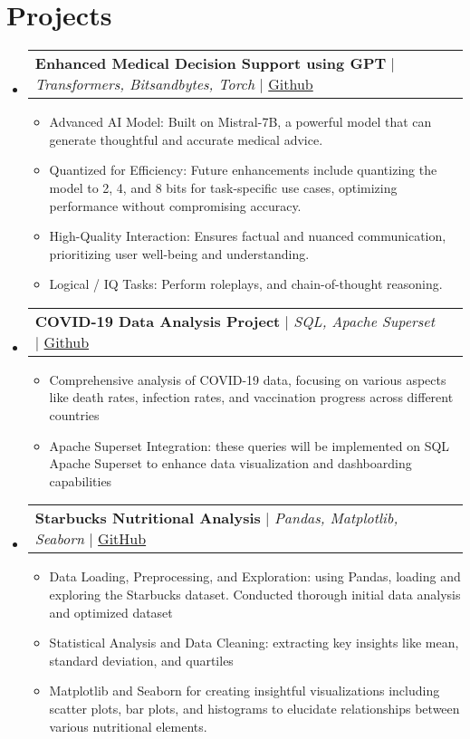 \documentclass[letterpaper,11pt]{article}
\makeatletter
\newcommand{\resumeItem}[1]{
  \item\small{
    {#1 \vspace{-2pt}}
  }
}
\newcommand{\resumeProjectHeading}[2]{
    \item
    \begin{tabular*}{1.001\textwidth}{l@{\extracolsep{\fill}}r}
      \small#1 & \textbf{\small #2} \\
    \end{tabular*}\vspace{-7pt}
}
\newcommand{\resumeSubHeadingListStart}{\begin{itemize}[leftmargin=0.0in, label={}]}
\newcommand{\resumeSubHeadingListEnd}{\end{itemize}}
\newcommand{\resumeItemListStart}{\justify \begin{itemize}}
\newcommand{\resumeItemListEnd}{\end{itemize}\vspace{-2pt}}
\makeatother
\begin{document}
\section{Projects}
    \vspace{-5pt}
    \resumeSubHeadingListStart
        \resumeProjectHeading
            {\textbf{Enhanced Medical Decision Support using GPT} $|$ \emph{Transformers, Bitsandbytes, Torch} $|$ \href{https://github.com/gauritripathi2002/DoctorLLM}{Github}}{}
            \resumeItemListStart
                \resumeItem{Advanced AI Model: Built on Mistral-7B, a powerful model that can generate thoughtful and accurate medical advice.}
                \resumeItem{Quantized for Efficiency: Future enhancements include quantizing the model to 2, 4, and 8 bits for task-specific use cases, optimizing performance without compromising accuracy.}
                \resumeItem{High-Quality Interaction: Ensures factual and nuanced communication, prioritizing user well-being and understanding.}
                \resumeItem{Logical / IQ Tasks: Perform roleplays, and chain-of-thought reasoning.}
          \resumeItemListEnd
        \resumeProjectHeading
            {\textbf{COVID-19 Data Analysis Project} $|$ \emph{SQL, Apache Superset} $|$ \href{https://github.com/gauritripathi2002/Global-COVID19-Data-Insights}{Github}}{}
            \resumeItemListStart
                \resumeItem{Comprehensive analysis of COVID-19 data, focusing on various aspects like death rates, infection rates, and vaccination progress across different countries}
                \resumeItem{Apache Superset Integration: these queries will be implemented on SQL Apache Superset to enhance data visualization and dashboarding capabilities}
            \resumeItemListEnd  
        \resumeProjectHeading
            {\textbf{Starbucks Nutritional Analysis} $|$ \emph{Pandas, Matplotlib, Seaborn} $|$ \href{https://github.com/gauritripathi2002/StarbucksNutriProfiler}{GitHub}}{} 
            \resumeItemListStart
                \resumeItem{Data Loading, Preprocessing, and Exploration: using Pandas, loading and exploring the Starbucks dataset. Conducted thorough initial data analysis and optimized dataset}
                \resumeItem{Statistical Analysis and Data Cleaning: extracting key insights like mean, standard deviation, and quartiles}
                \resumeItem{Matplotlib and Seaborn for creating insightful visualizations including scatter plots, bar plots, and histograms to elucidate relationships between various nutritional elements.}
          \resumeItemListEnd          
    \resumeSubHeadingListEnd
\end{document}
